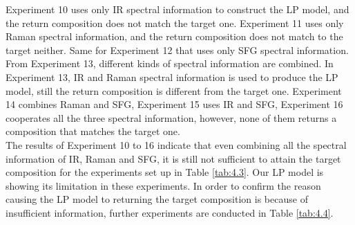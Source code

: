Experiment 10 uses only IR spectral information to construct the LP model, and the return composition does not match the target one. Experiment 11 uses only Raman spectral information, and the return composition does not match to the target neither. Same for Experiment 12 that uses only SFG spectral information. From Experiment 13, different kinds of spectral information are combined. In Experiment 13, IR and Raman spectral information is used to produce the LP model, still the return composition is different from the target one. Experiment 14 combines Raman and SFG, Experiment 15 uses IR and SFG, Experiment 16 cooperates all the three spectral information, however, none of them returns a composition that matches the target one. \\

The results of Experiment 10 to 16 indicate that even combining all the spectral information of IR, Raman and SFG, it is still not sufficient to attain the target composition for the experiments set up in Table \ref{tab:4.3}. Our LP model is showing its limitation in these experiments. In order to confirm the reason causing the LP model to returning the target composition is because of insufficient information, further experiments are conducted in Table \ref{tab:4.4}. \\

